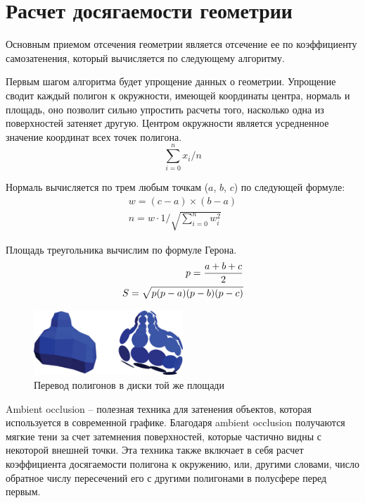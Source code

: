 
\clearpage
\section{Расчет досягаемости геометрии}\label{main_part}
Основным приемом отсечения геометрии является отсечение ее по коэффициенту самозатенения, который вычисляется по следующему алгоритму.

Первым шагом алгоритма будет упрощение данных о геометрии. Упрощение сводит каждый полигон к окружности, имеющей координаты центра, нормаль и площадь, оно позволит сильно упростить расчеты того, насколько одна из поверхностей затеняет другую. Центром окружности является усредненное значение координат всех точек полигона.
\begin{equation}
	\sum_{i=0}^{n} x_i / n
\end{equation}

Нормаль вычисляется по трем любым точкам ($a$, $b$, $c$) по следующей формуле:
\begin{equation}\begin{split}
	w = {(c-a) \times (b-a)} \\
	n = w \cdot 1 / \sqrt{\sum_{i=0}^{n} {w_i^2}}
\end{split}\end{equation}

Площадь треугольника вычислим по формуле Герона.
\begin{equation}\begin{split}
	p= {{a+b+c}\over{2}} \\
	S=\sqrt{p(p-a)(p-b)(p-c)}
\end{split}\end{equation}

\begin{figure}[h]
	\center
	\includegraphics[width=0.5\textwidth]{14_ambient_occlusion_02}
	\caption{Перевод полигонов в диски той же площади}\label{fig:ao02}
\end{figure}
Ambient occlusion -- полезная техника для затенения объектов, которая используется в современной графике. Благодаря ambient occlusion получаются мягкие тени за счет затемнения поверхностей, которые частично видны с некоторой внешней точки. Эта техника также включает в себя расчет коэффициента досягаемости полигона к окружению, или, другими словами, число обратное числу пересечений его с другими полигонами в полусфере перед первым.

